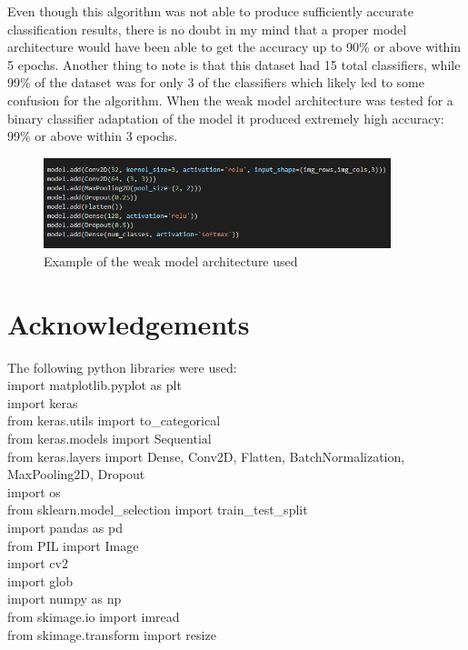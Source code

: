 \documentclass[12pt]{article}
\begin{document}
Even though this algorithm was not able to produce sufficiently accurate classification results, there is no doubt in my mind that a proper model architecture would have been able to get the accuracy up to 90\% or above within 5 epochs. Another thing to note is that this dataset had 15 total classifiers, while 99\% of the dataset was for only 3 of the classifiers which likely led to some confusion for the algorithm. When the weak model architecture was tested for a binary classifier adaptation of the model it produced extremely high accuracy: 99\% or above within 3 epochs.

\begin{figure}[!htb]
		\centering
		\includegraphics[width=0.9\textwidth]{weak_architecture.png}
		\caption{\label{: } Example of the weak model architecture used}
	\end{figure} 




\newpage
\section{Acknowledgements}
The following python libraries were used: \\
import matplotlib.pyplot as plt \\ 
import keras \\
from keras.utils import to\_categorical \\
from keras.models import Sequential \\
from keras.layers import Dense, Conv2D, Flatten, BatchNormalization, MaxPooling2D, Dropout \\ 
import os \\
from sklearn.model\_selection import train\_test\_split \\
import pandas as pd \\
from PIL import Image \\
import cv2 \\ 
import glob \\ 
import numpy as np \\
from skimage.io import imread \\
from skimage.transform import resize \\







\newpage


\end{document}
